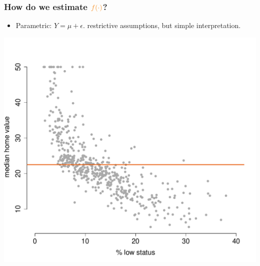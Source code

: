 \documentclass{beamer}
\newcommand{\bo}[1]{\textcolor{burntorange}{#1}}
\begin{document}
\begin{frame}[plain]
\frametitle{How do we estimate $\bo{f(\cdot)}$?}
\vspace{5mm}
\begin{itemize}
\item[] Parametric: $Y=\mu + \epsilon$. \bo{restrictive assumptions, but simple interpretation}.
\end{itemize}
\vspace{-9mm}
\begin{center}
\includegraphics[scale=.39]{DaveBostonplot1.pdf}
\end{center}


\end{frame}
\end{document}
